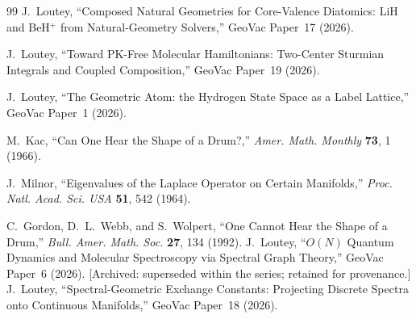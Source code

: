 \documentclass[aps,prl,reprint,amsmath,amssymb]{revtex4-2}
\begin{document}
\begin{thebibliography}{99}
J.~Loutey,
``Composed Natural Geometries for Core-Valence Diatomics: LiH and
BeH$^+$ from Natural-Geometry Solvers,''
GeoVac Paper~17 (2026).

J.~Loutey,
``Toward PK-Free Molecular Hamiltonians: Two-Center Sturmian Integrals
and Coupled Composition,''
GeoVac Paper~19 (2026).

J.~Loutey,
``The Geometric Atom: the Hydrogen State Space as a Label Lattice,''
GeoVac Paper~1 (2026).

M.~Kac,
``Can One Hear the Shape of a Drum?,''
\textit{Amer. Math. Monthly} \textbf{73}, 1 (1966).

J.~Milnor,
``Eigenvalues of the Laplace Operator on Certain Manifolds,''
\textit{Proc. Natl. Acad. Sci. USA} \textbf{51}, 542 (1964).

C.~Gordon, D.~L.~Webb, and S.~Wolpert,
``One Cannot Hear the Shape of a Drum,''
\textit{Bull. Amer. Math. Soc.} \textbf{27}, 134 (1992).
J.~Loutey,
``$O(N)$ Quantum Dynamics and Molecular Spectroscopy via Spectral Graph Theory,''
GeoVac Paper~6 (2026).
[Archived: superseded within the series; retained for provenance.]
J.~Loutey,
``Spectral-Geometric Exchange Constants: Projecting Discrete Spectra onto Continuous Manifolds,''
GeoVac Paper~18 (2026).
\end{thebibliography}
\end{document}
